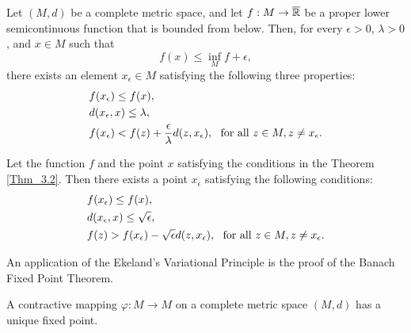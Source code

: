 \begin{theorem}\label{Thm_3.2}
    Let $(M, d)$ be a complete metric space, and let $f : M \to \overline{\mathbb{R}}$ be 
    a proper lower semicontinuous function that is bounded from below. Then, 
    for every $\epsilon > 0$, $\lambda > 0$, and $x \in M$ such that
    $$ 
        f(x) \leq \inf_{M} f + \epsilon,
    $$
    there exists an element $x_{\epsilon}\in M$ satisfying the following three 
    properties:
    \begin{align}
        & f(x_{\epsilon}) \leq f(x), \notag \\
        & d(x_{\epsilon}, x) \leq \lambda,  \\
        & f(x_{\epsilon}) < f(z) + \frac{\epsilon}{\lambda}d(z,x_{\epsilon}), \ 
         \text{ for all } z\in M, z \neq x_{\epsilon} .\notag 
    \end{align}
\end{theorem}

\begin{corollary}
    Let the function $f$ and the point $x$ satisfying the conditions in the
    Theorem \ref{Thm_3.2}. Then there exists a point $x_{\epsilon}$ satisfying
    the following conditions:
     \begin{align}
        & f(x_{\epsilon}) \leq f(x), \notag \\
        & d(x_{\epsilon}, x) \leq \sqrt{\epsilon},  \\
        &  f(z) >  f(x_{\epsilon}) -\sqrt{\epsilon}d(z,x_{\epsilon}), \ %
         \text{ for all } z\in M, z \neq x_{\epsilon}. \notag 
    \end{align}
\end{corollary}
An application of the Ekeland's Variational Principle is the proof of the Banach
Fixed Point Theorem.
\begin{theorem}
    A contractive mapping $\varphi : M \to M$ on a complete metric space $(M,d)$
    has a unique fixed point.
\end{theorem}
